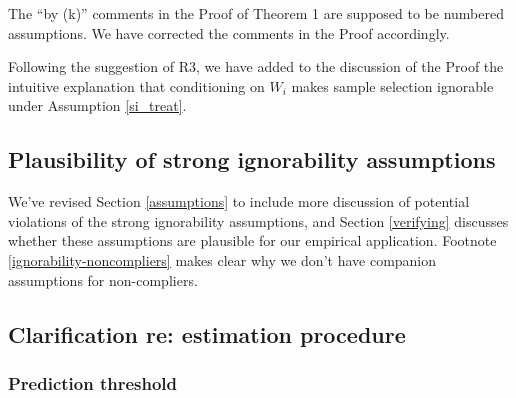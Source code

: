 \documentclass[hidelinks,12pt,letterpaper]{article}
\begin{document}

The ``by (k)'' comments in the Proof of Theorem 1 are supposed to be numbered assumptions. We have corrected the comments in the Proof accordingly. 


Following the suggestion of R3, we have added to the discussion of the Proof the intuitive explanation that conditioning on $W_i$ makes sample selection ignorable under Assumption \ref{si_treat}. 

\subsection{Plausibility of strong ignorability assumptions}

We've revised Section \ref{assumptions} to include more discussion of potential violations of the strong ignorability assumptions, and Section \ref{verifying} discusses whether these assumptions are plausible for our empirical application. Footnote \ref{ignorability-noncompliers} makes clear why we don’t have companion assumptions for non-compliers.

\subsection{Clarification re: estimation procedure}

\subsubsection{Prediction threshold}
\end{document}
